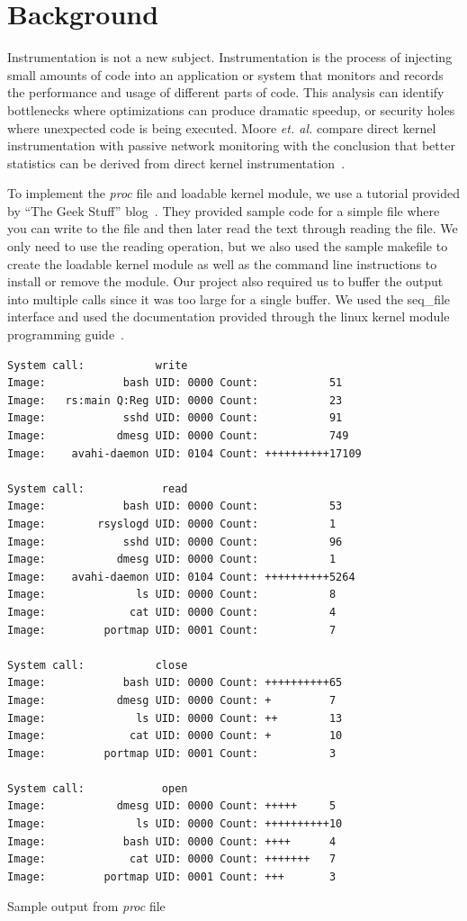 \documentclass[conference]{IEEEtran}
\begin{document}
\section{Background}
\label{sec:background}
Instrumentation is not a new subject.
Instrumentation is the process of injecting small amounts of code into an application or system that monitors and records the performance and usage of different parts of code.
This analysis can identify bottlenecks where optimizations can produce dramatic speedup, or security holes where unexpected code is being executed.
Moore \textit{et. al.} compare direct kernel instrumentation with passive network monitoring with the conclusion that better statistics can be derived from direct kernel instrumentation~\cite{cit:1}.

To implement the \textit{proc} file and loadable kernel module, we use a tutorial provided by ``The Geek Stuff'' blog~\cite{cit:2}.
They provided sample code for a simple file where you can write to the file and then later read the text through reading the file.
We only need to use the reading operation, but we also used the sample makefile to create the loadable kernel module as well as the command line instructions to install or remove the module.
Our project also required us to buffer the output into multiple calls since it was too large for a single buffer.
We used the seq\_file interface and used the documentation provided through the linux kernel module programming guide~\cite{cit:3}.

\begin{algorithm*}[t!]
\begin{verbatim}
System call:           write
Image:            bash UID: 0000 Count:           51
Image:   rs:main Q:Reg UID: 0000 Count:           23
Image:            sshd UID: 0000 Count:           91
Image:           dmesg UID: 0000 Count:           749
Image:    avahi-daemon UID: 0104 Count: ++++++++++17109

System call:            read
Image:            bash UID: 0000 Count:           53
Image:        rsyslogd UID: 0000 Count:           1
Image:            sshd UID: 0000 Count:           96
Image:           dmesg UID: 0000 Count:           1
Image:    avahi-daemon UID: 0104 Count: ++++++++++5264
Image:              ls UID: 0000 Count:           8
Image:             cat UID: 0000 Count:           4
Image:         portmap UID: 0001 Count:           7

System call:           close
Image:            bash UID: 0000 Count: ++++++++++65
Image:           dmesg UID: 0000 Count: +         7
Image:              ls UID: 0000 Count: ++        13
Image:             cat UID: 0000 Count: +         10
Image:         portmap UID: 0001 Count:           3

System call:            open
Image:           dmesg UID: 0000 Count: +++++     5
Image:              ls UID: 0000 Count: ++++++++++10
Image:            bash UID: 0000 Count: ++++      4
Image:             cat UID: 0000 Count: +++++++   7
Image:         portmap UID: 0001 Count: +++       3
\end{verbatim}
\caption{Sample output from \textit{proc} file}
\end{algorithm*}
\end{document}
